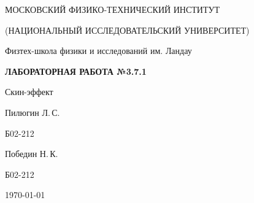 
\begin{center}
    {
        \MakeUppercase{Московский физико-технический институт}

        \MakeUppercase{(Национальный исследовательский университет)}
    }

    {
        Физтех-школа физики и исследований им. Ландау
    }
    
    \vspace{200pt}
    {
        \Huge
        \bfseries
        \MakeUppercase{Лабораторная работа №3.7.1}
    }

    \vspace{24pt}
    {
        \Large
        Скин-эффект
    }

    \vspace{24pt}
    {
        \large
        Пилюгин Л.\,С.

        Б02-212
    }

    {
        \large
        Победин Н.\,К.

        Б02-212
    }

    \vspace{2pt}
    {
        \large
        \today
    }
\end{center}

\newpage
{}
\setcounter{page}{2}
